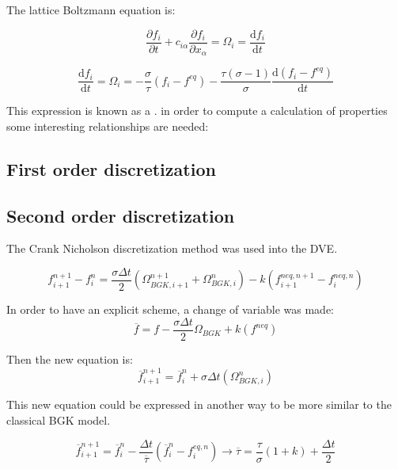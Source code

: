 \documentclass{article}
\begin{document}
The lattice Boltzmann equation is: 

\begin{equation}
    \frac{\partial f_{i}}{\partial t} +c_{i\alpha }\frac{\partial f_{i}}{\partial x_{\alpha }} =\Omega _{i} =\frac{\mathrm{d} f_{i}}{\mathrm{d} t}
\end{equation}

\begin{equation}
    \frac{\mathrm{d} f_{i}}{\mathrm{d} t}=\Omega _{i}= -\frac{\sigma}{\tau}(f_i-f^{eq}) - \frac{\tau(\sigma-1)}{\sigma}\frac{\mathrm{d}(f_i-f^{eq})}{\mathrm{d}t} 
\end{equation}

This expression is known as a . in order to compute a calculation of properties some interesting relationships are needed:
\subsection{First order discretization}

\subsection{Second order discretization}
The Crank Nicholson discretization method was used into the DVE.

\begin{equation}
    f_{i+1}^{n+1} -f_{i}^{n} =\frac{\sigma\Delta t}{2}\left( \Omega _{BGK,i+1}^{n+1} +\Omega _{BGK,i}^{n}\right) -k\left( f_{i+1}^{neq,n+1} -f_{i}^{neq,n}\right)
\end{equation}

In order to have an explicit scheme, a change of variable was made:
\begin{equation}
    \overline{f} =f-\frac{\sigma\Delta t}{2}\Omega _{BGK} +k\left( f^{neq}\right)
\end{equation}

Then the new equation is:
\begin{equation}
    \overline{f}_{i+1}^{n+1} =\overline{f}_{i}^{n} +\sigma\Delta t\left( \Omega _{BGK,i}^{n}\right)
\end{equation}

This new equation could be expressed in another way to be more similar to the classical BGK model.

\begin{equation}
    \overline{f}_{i+1}^{n+1} =\overline{f}_{i}^{n} -\frac{\Delta t}{\overline{\tau }}\left(\overline{f}_{i}^{n} -f_{i}^{eq,n}\right)\rightarrow \overline{\tau } =\frac{\tau}{\sigma} ( 1+k) +\frac{\Delta t}{2}
\end{equation}
\end{document}
